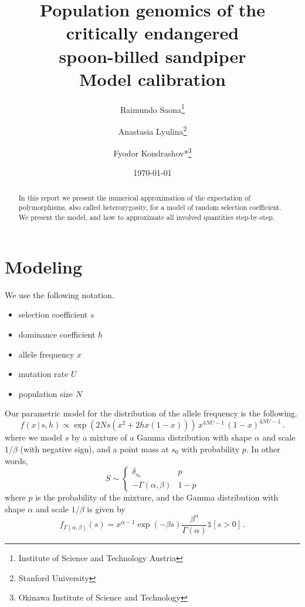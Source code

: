 \documentclass[a4paper,11pt]{article}
\newcommand{\1}{\mathds{1}}
\theoremstyle{plain} %
\theoremstyle{definition} %
\theoremstyle{remark} %
\begin{document}
\title { 
    Population genomics of the critically endangered\\
    spoon-billed sandpiper\\
    Model calibration
}

\author { 
    Raimundo Saona\thanks{Institute of Science and Technology Austria}
    \and Anastasia Lyulina\thanks{Stanford University} 
    \and Fyodor Kondrashov*\thanks{Okinawa Institute of Science and Technology}
}

\date {
    \today
}


\maketitle

\begin{abstract}
	In this report we present the numerical approximation of the expectation of polymorphisms, also called heterozygosity, for a model of random selection coefficient.
	We present the model, and how to approximate all involved quantities step-by-step. 
\end{abstract}

\tableofcontents

\newpage


\section{Modeling}

We use the following notation.
\begin{itemize} 
	\item 
		selection coefficient $s$
	\item 
		dominance coefficient $h$
	\item 
		allele frequency $x$
	\item 
		mutation rate $U$
	\item 
		population size $N$
\end{itemize} 

Our parametric model for the distribution of the allele frequency is the following.
\[
	f(x \,|\, s, h) \propto \exp(2N s  ( x^2 + 2h x (1 - x) ) ) \, x^{4 N U - 1} \, (1 - x)^{4 N U - 1} \,.
\]
where we model $s$ by a mixture of a Gamma distribution with shape $\alpha$ and scale $1 / \beta$ (with negative sign), and a point mass at $s_0$ with probability $p$. 
In other words, 
\[
	S \sim \begin{cases}
		\delta_{s_0} 
			& p \\
		- \Gamma(\alpha, \beta)
			& 1 - p
	\end{cases}
\]
where $p$ is the probability of the mixture, and the Gamma distribution with shape $\alpha$ and scale $1 / \beta$ is given by
\[
	f_{\Gamma(\alpha, \beta)}(s) = x^{\alpha - 1} \exp(- \beta s) \frac{\beta^\alpha}{\Gamma(\alpha)} \1[s > 0]\,.
\]
\end{document}
